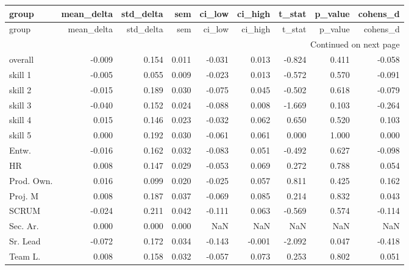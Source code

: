 \begin{longtable}{lrrrrrrrr}
\toprule
group & mean\_delta & std\_delta & sem & ci\_low & ci\_high & t\_stat & p\_value & cohens\_d \\
\midrule
\endfirsthead
\toprule
group & mean\_delta & std\_delta & sem & ci\_low & ci\_high & t\_stat & p\_value & cohens\_d \\
\midrule
\endhead
\midrule
\multicolumn{9}{r}{Continued on next page} \\
\midrule
\endfoot
\bottomrule
\endlastfoot
overall & -0.009 & 0.154 & 0.011 & -0.031 & 0.013 & -0.824 & 0.411 & -0.058 \\
skill 1 & -0.005 & 0.055 & 0.009 & -0.023 & 0.013 & -0.572 & 0.570 & -0.091 \\
skill 2 & -0.015 & 0.189 & 0.030 & -0.075 & 0.045 & -0.502 & 0.618 & -0.079 \\
skill 3 & -0.040 & 0.152 & 0.024 & -0.088 & 0.008 & -1.669 & 0.103 & -0.264 \\
skill 4 & 0.015 & 0.146 & 0.023 & -0.032 & 0.062 & 0.650 & 0.520 & 0.103 \\
skill 5 & 0.000 & 0.192 & 0.030 & -0.061 & 0.061 & 0.000 & 1.000 & 0.000 \\
Entw. & -0.016 & 0.162 & 0.032 & -0.083 & 0.051 & -0.492 & 0.627 & -0.098 \\
HR & 0.008 & 0.147 & 0.029 & -0.053 & 0.069 & 0.272 & 0.788 & 0.054 \\
Prod. Own. & 0.016 & 0.099 & 0.020 & -0.025 & 0.057 & 0.811 & 0.425 & 0.162 \\
Proj. M & 0.008 & 0.187 & 0.037 & -0.069 & 0.085 & 0.214 & 0.832 & 0.043 \\
SCRUM & -0.024 & 0.211 & 0.042 & -0.111 & 0.063 & -0.569 & 0.574 & -0.114 \\
Sec. Ar. & 0.000 & 0.000 & 0.000 & NaN & NaN & NaN & NaN & NaN \\
Sr. Lead & -0.072 & 0.172 & 0.034 & -0.143 & -0.001 & -2.092 & 0.047 & -0.418 \\
Team L. & 0.008 & 0.158 & 0.032 & -0.057 & 0.073 & 0.253 & 0.802 & 0.051 \\
\end{longtable}

